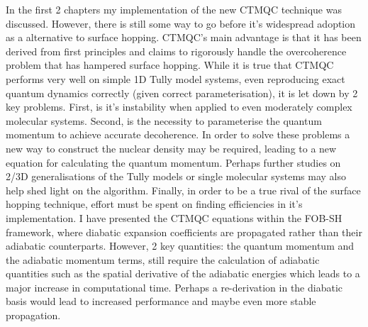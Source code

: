 In the first 2 chapters my implementation of the new CTMQC technique was discussed. However, there is still some way to go before it's widespread adoption as a alternative to surface hopping. CTMQC's main advantage is that it has been derived from first principles and claims to rigorously handle the overcoherence problem that has hampered surface hopping. While it is true that CTMQC performs very well on simple 1D Tully model systems, even reproducing exact quantum dynamics correctly (given correct parameterisation), it is let down by 2 key problems. First, is it's instability when applied to even moderately complex molecular systems. Second, is the necessity to parameterise the quantum momentum to achieve accurate decoherence. In order to solve these problems a new way to construct the nuclear density may be required, leading to a new equation for calculating the quantum momentum. Perhaps further studies on 2/3D generalisations of the Tully models or single molecular systems may also help shed light on the algorithm. Finally, in order to be a true rival of the surface hopping technique, effort must be spent on finding efficiencies in it's implementation. I have presented the CTMQC equations within the FOB-SH framework, where diabatic expansion coefficients are propagated rather than their adiabatic counterparts. However, 2 key quantities: the quantum momentum and the adiabatic momentum terms, still require the calculation of adiabatic quantities such as the spatial derivative of the adiabatic energies which leads to a major increase in computational time. Perhaps a re-derivation in the diabatic basis would lead to increased performance and maybe even more stable propagation.
\\\\
